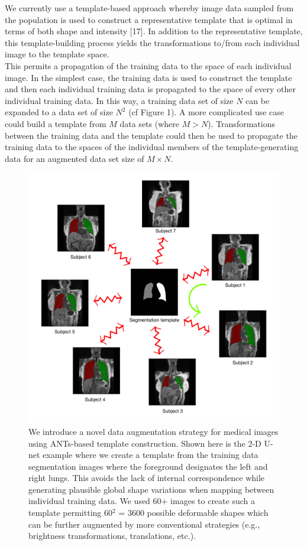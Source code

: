 \documentclass[11pt,]{article}
\begin{document}
We currently use a template-based approach whereby image data sampled
from the population is used to construct a representative template that
is optimal in terms of both shape and intensity {[}17{]}. In addition to
the representative template, this template-building process yields the
transformations to/from each individual image to the template space.\\
This permits a propagation of the training data to the space of each
individual image. In the simplest case, the training data is used to
construct the template and then each individual training data is
propagated to the space of every other individual training data. In this
way, a training data set of size \(N\) can be expanded to a data set of
size \(N^2\) (cf Figure 1). A more complicated use case could build a
template from \(M\) data sets (where \(M > N\)). Transformations between
the training data and the template could then be used to propagate the
training data to the spaces of the individual members of the
template-generating data for an augmented data set size of
\(M \times N\).

\begin{figure}
\centering
\includegraphics[width=\textwidth]{./Figures/DataAugmentation.pdf}
\caption{We introduce a novel data augmentation strategy for medical images using 
ANTs-based template construction.  Shown here is the 2-D U-net example where 
we create a template from the training data segmentation images where the 
foreground designates the left and right lungs.  This avoids the lack of 
internal correspondence while generating plausible global shape variations 
when mapping between individual training data.  We used 60+ images to 
create such a template permitting 60$^2$ = 3600 possible deformable shapes 
which can be further augmented by more conventional strategies (e.g., brightness
transformations, translations, etc.).}
\label{fig:augmentation}
\end{figure}
\end{document}
